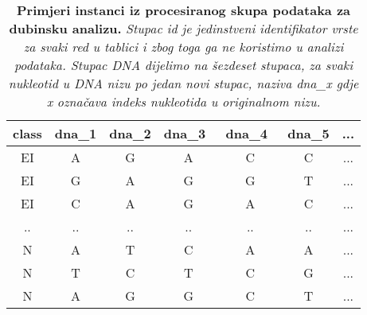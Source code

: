 \begin{table}[!ht]
   \caption[Primjeri instanci iz procesiranog skupa podataka]{
   \textbf{Primjeri instanci iz procesiranog skupa podataka za dubinsku analizu.} \textit{
Stupac \textit{id} je jedinstveni identifikator vrste za svaki red u tablici i zbog toga ga ne koristimo u analizi podataka. Stupac \textit{DNA} dijelimo na šezdeset stupaca, za svaki nukleotid u DNA nizu po jedan novi stupac, naziva dna\_x gdje x označava indeks nukleotida u originalnom nizu.
   }}
   \centering
   \begin{tabular}{||c | c | c |c | c | c | c ||}
   \hline
   class & dna{\_1} & dna{\_}2 & dna{\_}3\ & dna{\_}4\ & dna{\_}5 & ...\\ [0.5ex]
   \hline\hline
   EI & A & G & A & C & C & ... \\
   EI & G & A & G & G & T & ... \\
   EI & C & A & G & A & C & ... \\
   .. & .. & .. & .. & .. & .. & ... \\
   N & A  & T & C & A & A & ... \\
   N & T  & C & T & C & G & ... \\
   N & A  & G & G & C & T & ... \\ [1ex]
   \hline
   \end{tabular}
   \label{tab:datasplit}
\end{table}

